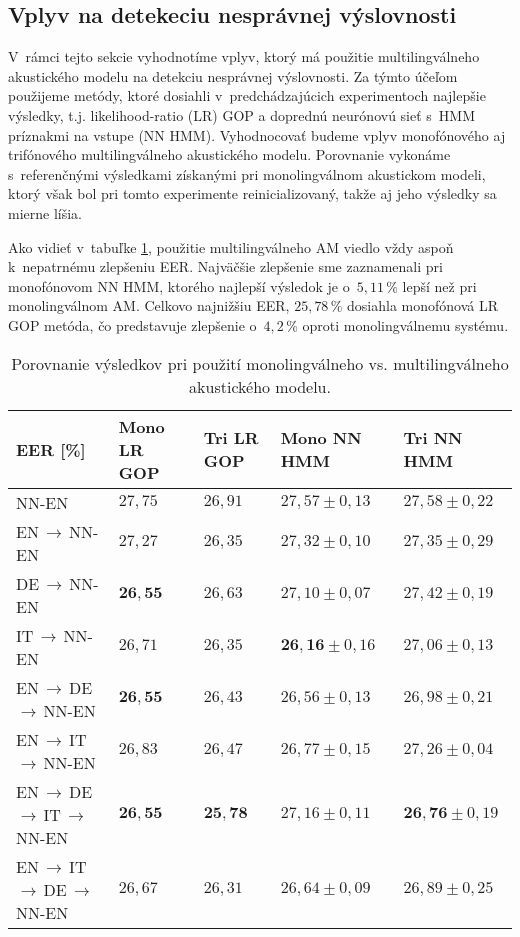 
\subsection{Vplyv na detekeciu nesprávnej výslovnosti}

V~rámci tejto sekcie vyhodnotíme vplyv, ktorý má použitie multilingválneho akustického modelu na detekciu nesprávnej výslovnosti. Za týmto účeľom použijeme metódy, ktoré dosiahli v~predchádzajúcich experimentoch najlepšie výsledky, t.j. likelihood-ratio (LR) GOP a doprednú neurónovú sieť s~HMM príznakmi na vstupe (NN HMM). Vyhodnocovať budeme vplyv monofónového aj trifónového multilingválneho akustického modelu. Porovnanie vykonáme s~referenčnými výsledkami získanými pri monolingválnom akustickom modeli, ktorý však bol pri tomto experimente reinicializovaný, takže aj jeho výsledky sa mierne líšia.

Ako vidieť v~tabuľke \ref{tab:mono-vs-multi-am}, použitie multilingválneho AM viedlo vždy aspoň k~nepatrnému zlepšeniu EER. Najväčšie zlepšenie sme zaznamenali pri monofónovom NN HMM, ktorého najlepší výsledok je o~$5{,}11\,\%$ lepší než pri monolingválnom AM. Celkovo najnižšiu EER, $25{,}78\,\%$ dosiahla monofónová LR GOP metóda, čo predstavuje zlepšenie o~$4{,}2\,\%$ oproti monolingválnemu systému. 

\begin{table}[h!]
    \centering
    \begin{tabular}{@{}lllll@{}}
    \toprule
    EER {[}\%{]} & Mono LR GOP  & Tri LR GOP & Mono NN HMM  & Tri NN HMM \\ \midrule
    NN-EN & $27{,}75$ & $26{,}91$ & $27{,}57 \pm 0{,}13$ & $27{,}58 \pm 0{,}22$ \\
    EN\,$\rightarrow$\,NN-EN  & $27{,}27$ & $26{,}35$ & $27{,}32 \pm 0{,}10$ & $27{,}35 \pm 0{,}29$ \\ 
    DE\,$\rightarrow$\,NN-EN  & $\bm{26{,}55}$ & $26{,}63$ & $27{,}10 \pm 0{,}07$ & $27{,}42 \pm 0{,}19$ \\ 
    IT\,$\rightarrow$\,NN-EN  & $26{,}71$ & $26{,}35$ & $\bm{26{,}16} \pm 0{,}16$ & $27{,}06 \pm 0{,}13$ \\ 
    EN\,$\rightarrow$\,DE\,$\rightarrow$\,NN-EN & $\bm{26{,}55}$ & $26{,}43$ & $26{,}56 \pm 0{,}13$ & $26{,}98 \pm 0{,}21$ \\
    EN\,$\rightarrow$\,IT\,$\rightarrow$\,NN-EN & $26{,}83$ & $26{,}47$ & $26{,}77 \pm 0{,}15$ & $27{,}26 \pm 0{,}04$ \\
    EN\,$\rightarrow$\,DE\,$\rightarrow$\,IT\,$\rightarrow$NN-EN & $\bm{26{,}55}$ & $\bm{25{,}78}$ & $27{,}16 \pm 0{,}11$ & $\bm{26{,}76} \pm 0{,}19$ \\
    EN\,$\rightarrow$\,IT\,$\rightarrow$\,DE\,$\rightarrow$NN-EN & $26{,}67$ & $26{,}31$ & $26{,}64 \pm 0{,}09$ & $26{,}89 \pm 0{,}25$ \\
    \bottomrule
    \end{tabular}
    \caption{Porovnanie výsledkov pri použití monolingválneho vs. multilingválneho akustického modelu.} \label{tab:mono-vs-multi-am}
\end{table}

